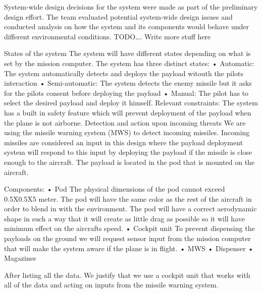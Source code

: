 System-wide design decisions for the system were made as part of the preliminary design effort. The team evaluated potential system-wide design issues and conducted analysis on how the system and its components would behave under different environmental conditions. 
TODO…. Write more stuff here

States of the system
The system will have different states depending on what is set by the mission computer. The system has three distinct states: 
•	Automatic: The system automatically detects and deploys the payload witouth the pilots interaction
•	Semi-automatic: The system detects the enemy missile but it asks for the pilots consent before deploying the payload
•	Manual: The pilot has to select the desired payload and deploy it himself.
Relevant constraints: The system has a built in safety feature which will prevent deployment of the payload when the plane is not airborne.
Detection and action upon incoming threats
We are using the missile warning system (MWS) to detect incoming missiles. Incoming missiles are considered an input in this design where the payload deployment system will respond to this input by deploying the payload if the missile is close enough to the aircraft. The payload is located in the pod that is mounted on the aircraft.

Components:
•	Pod
The physical dimensions of the pod cannot exceed 0.5X0.5X5 meter. The pod will have the same color as the rest of the aircraft in order to blend in with the environment. The pod will have a correct aerodynamic shape in such a way that it will create as little drag as possible so it will have minimum effect on the aircrafts speed. 
•	Cockpit unit
To prevent dispensing the payloads on the ground we will request sensor input from the mission computer that will make the system aware if the plane is in flight.
•	MWS
•	Dispenser
•	Magazines

After listing all the data. We justify that we use a cockpit unit that works with all of the data and acting on inputs from the missile warning system.

